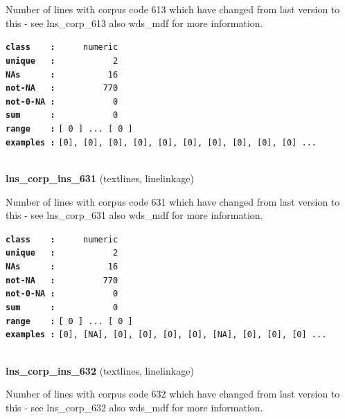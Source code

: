 \documentclass[]{article}
\begin{document}
Number of lines with corpus code 613 which have changed from last
version to this - see lns\_corp\_613 also wds\_mdf for more information.

\textbf{\texttt{class\ \ \ \ :}} \texttt{~~~~~numeric}\\
\textbf{\texttt{unique\ \ \ :}} \texttt{~~~~~~~~~~~2}\\
\textbf{\texttt{NAs\ \ \ \ \ \ :}} \texttt{~~~~~~~~~~16}\\
\textbf{\texttt{not-NA\ \ \ :}} \texttt{~~~~~~~~~770}\\
\textbf{\texttt{not-0-NA\ :}} \texttt{~~~~~~~~~~~0}\\
\textbf{\texttt{sum\ \ \ \ \ \ :}} \texttt{~~~~~~~~~~~0}\\
\textbf{\texttt{range\ \ \ \ :}}
\texttt{{[}\ 0\ {]}\ ...\ {[}\ 0\ {]}}\\
\textbf{\texttt{examples\ :}}
\texttt{{[}0{]},\ {[}0{]},\ {[}0{]},\ {[}0{]},\ {[}0{]},\ {[}0{]},\ {[}0{]},\ {[}0{]},\ {[}0{]},\ {[}0{]}\ ...}\\

~

\textbf{lns\_corp\_ins\_631} (textlines, linelinkage)

Number of lines with corpus code 631 which have changed from last
version to this - see lns\_corp\_631 also wds\_mdf for more information.

\textbf{\texttt{class\ \ \ \ :}} \texttt{~~~~~numeric}\\
\textbf{\texttt{unique\ \ \ :}} \texttt{~~~~~~~~~~~2}\\
\textbf{\texttt{NAs\ \ \ \ \ \ :}} \texttt{~~~~~~~~~~16}\\
\textbf{\texttt{not-NA\ \ \ :}} \texttt{~~~~~~~~~770}\\
\textbf{\texttt{not-0-NA\ :}} \texttt{~~~~~~~~~~~0}\\
\textbf{\texttt{sum\ \ \ \ \ \ :}} \texttt{~~~~~~~~~~~0}\\
\textbf{\texttt{range\ \ \ \ :}}
\texttt{{[}\ 0\ {]}\ ...\ {[}\ 0\ {]}}\\
\textbf{\texttt{examples\ :}}
\texttt{{[}0{]},\ {[}NA{]},\ {[}0{]},\ {[}0{]},\ {[}0{]},\ {[}0{]},\ {[}NA{]},\ {[}0{]},\ {[}0{]},\ {[}0{]}\ ...}\\

~

\textbf{lns\_corp\_ins\_632} (textlines, linelinkage)

Number of lines with corpus code 632 which have changed from last
version to this - see lns\_corp\_632 also wds\_mdf for more information.
\end{document}
